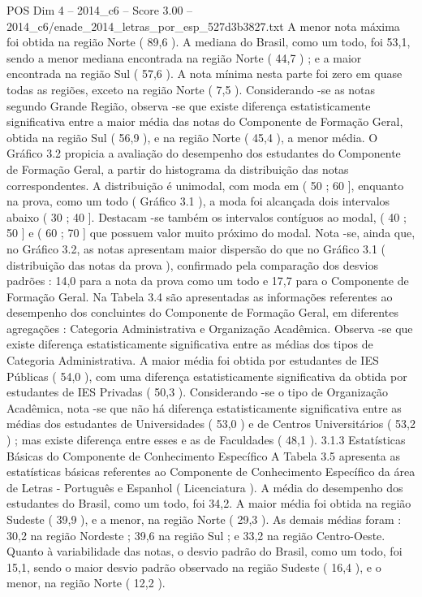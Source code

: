 \begin{textsample}{POS Dim 4 – 2014\_c6 – Score 3.00 – 2014\_c6/enade\_2014\_letras\_por\_esp\_527d3b3827.txt}
A menor nota máxima foi obtida na região Norte ( 89,6 ).
A mediana do Brasil, como um todo, foi 53,1, sendo a menor mediana encontrada na região Norte ( 44,7 ) ; e a maior encontrada na região Sul ( 57,6 ).
A nota mínima nesta parte foi zero em quase todas as regiões, exceto na região Norte ( 7,5 ).
Considerando -se as notas segundo Grande Região, observa -se que existe diferença estatisticamente significativa entre a maior média das notas do Componente de Formação Geral, obtida na região Sul ( 56,9 ), e na região Norte ( 45,4 ), a menor média.
O Gráfico 3.2 propicia a avaliação do desempenho dos estudantes do Componente de Formação Geral, a partir do histograma da distribuição das notas correspondentes.
A distribuição é unimodal, com moda em ( 50 ; 60 ], enquanto na prova, como um todo ( Gráfico 3.1 ), a moda foi alcançada dois intervalos abaixo ( 30 ; 40 ].
Destacam -se também os intervalos contíguos ao modal, ( 40 ; 50 ] e ( 60 ; 70 ] que possuem valor muito próximo do modal.
Nota -se, ainda que, no Gráfico 3.2, as notas apresentam maior dispersão do que no Gráfico 3.1 ( distribuição das notas da prova ), confirmado pela comparação dos desvios padrões : 14,0 para a nota da prova como um todo e 17,7 para o Componente de Formação Geral.
Na Tabela 3.4 são apresentadas as informações referentes ao desempenho dos concluintes do Componente de Formação Geral, em diferentes agregações : Categoria Administrativa e Organização Acadêmica.
Observa -se que existe diferença estatisticamente significativa entre as médias dos tipos de Categoria Administrativa.
A maior média foi obtida por estudantes de IES Públicas ( 54,0 ), com uma diferença estatisticamente significativa da obtida por estudantes de IES Privadas ( 50,3 ).
Considerando -se o tipo de Organização Acadêmica, nota -se que não há diferença estatisticamente significativa entre as médias dos estudantes de Universidades ( 53,0 ) e de Centros Universitários ( 53,2 ) ; mas existe diferença entre esses e as de Faculdades ( 48,1 ). 3.1.3 Estatísticas Básicas do Componente de Conhecimento Específico A Tabela 3.5 apresenta as estatísticas básicas referentes ao Componente de Conhecimento Específico da área de Letras - Português e Espanhol ( Licenciatura ).
A média do desempenho dos estudantes do Brasil, como um todo, foi 34,2.
A maior média foi obtida na região Sudeste ( 39,9 ), e a menor, na região Norte ( 29,3 ).
As demais médias foram : 30,2 na região Nordeste ; 39,6 na região Sul ; e 33,2 na região Centro-Oeste.
Quanto à variabilidade das notas, o desvio padrão do Brasil, como um todo, foi 15,1, sendo o maior desvio padrão observado na região Sudeste ( 16,4 ), e o menor, na região Norte ( 12,2 ).

\end{textsample}

